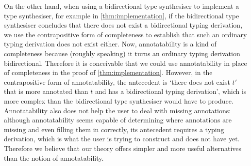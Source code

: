 On the other hand, when using a bidirectional type synthesiser to implement a type synthesiser, for example in \cref{thm:implementation}, if the bidirectional type synthesiser concludes that there does not exist a bidirectional typing derivation, we use the contrapositive form of completeness to establish that such an ordinary typing derivation does not exist either.
Now, annotatability is a kind of completeness because (roughly speaking) it turns an ordinary typing derivation bidirectional.
Therefore it is conceivable that we could use annotatability in place of completeness in the proof of \cref{thm:implementation}.
However, in the contrapositive form of annotatability, the antecedent is `there does not exist $t'$ that is more annotated than $t$ and has a bidirectional typing derivation', which is more complex than the bidirectional type synthesiser would have to produce.
Annotatability also does not help the user to deal with missing annotations: although annotatability seems capable of determining where annotations are missing and even filling them in correctly, its antecedent requires a typing derivation, which is what the user is trying to construct and does not have yet.
Therefore we believe that our theory offers simpler and more useful alternatives than the notion of annotatability.
